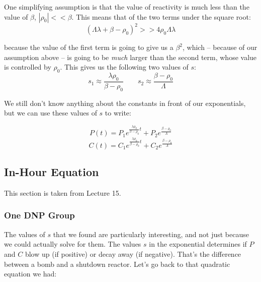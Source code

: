 \documentclass[letter]{article}
\begin{document}
One simplifying assumption is that the value of reactivity is much less than the
value of $\beta$, $|\rho_0| << \beta$. This means that of the two
terms under the square root:
\begin{equation*}
  (\Lambda\lambda+\beta-\rho_0)^2 >> 4\rho_0\Lambda\lambda
\end{equation*}

because the value of the first term is going to give us a $\beta^2$,
which -- because of our assumption above -- is going to be
\textit{much} larger than the second term, whose value is controlled
by $\rho_0$. This gives us the following two values of $s$:
\begin{equation*}
    s_1 \approx \frac{\lambda\rho_0}{\beta-\rho_0} \quad\quad
    s_2 \approx \frac{\beta-\rho_0}{\Lambda}
\end{equation*}

We still don't know anything about the constants in front of our
exponentials, but we can use these values of $s$ to write:

\begin{equation*}
  P(t)=P_1e^{\frac{\lambda\rho_0}{\beta-\rho_0}t}+P_2e^{\frac{\beta-\rho_0}{\Lambda}}
\end{equation*}
\begin{equation*}
  C(t)=C_1e^{\frac{\lambda\rho_0}{\beta-\rho_0}t}+C_2e^{\frac{\beta-\rho_0}{\Lambda}}
\end{equation*}

\subsection{In-Hour Equation}

This section is taken from Lecture 15.~\cite{lecture}

\subsubsection{One DNP Group}

The values of $s$ that we found are particularly interesting, and not
just because we could actually solve for them. The values $s$ in
the exponential determines if $P$ and $C$ blow up (if positive) or decay
away (if negative). That's the difference between a bomb and a
shutdown reactor. Let's go back to that quadratic equation we had:
\end{document}
